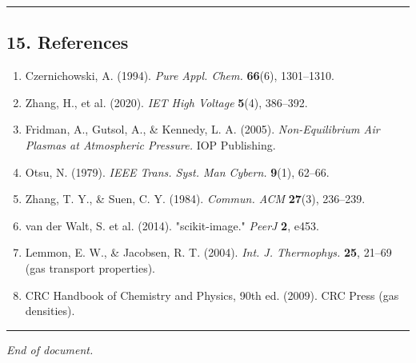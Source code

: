 \documentclass[
  11pt,
]{article}
\providecommand{\tightlist}{%
  \setlength{\itemsep}{0pt}\setlength{\parskip}{0pt}}
\begin{document}
\begin{center}\rule{0.5\linewidth}{0.5pt}\end{center}

\hypertarget{15-references}{%
\subsection{15. References}\label{15-references}}

\begin{enumerate}
\def\labelenumi{\arabic{enumi}.}
\tightlist
\item
  Czernichowski, A. (1994). \emph{Pure Appl. Chem.} \textbf{66}(6),
  1301--1310.
\item
  Zhang, H., et al. (2020). \emph{IET High Voltage} \textbf{5}(4),
  386--392.
\item
  Fridman, A., Gutsol, A., \& Kennedy, L. A. (2005).
  \emph{Non-Equilibrium Air Plasmas at Atmospheric Pressure.} IOP
  Publishing.
\item
  Otsu, N. (1979). \emph{IEEE Trans. Syst. Man Cybern.} \textbf{9}(1),
  62--66.
\item
  Zhang, T. Y., \& Suen, C. Y. (1984). \emph{Commun. ACM}
  \textbf{27}(3), 236--239.
\item
  van der Walt, S. et al. (2014). "scikit-image." \emph{PeerJ}
  \textbf{2}, e453.
\item
  Lemmon, E. W., \& Jacobsen, R. T. (2004). \emph{Int. J. Thermophys.}
  \textbf{25}, 21--69 (gas transport properties).
\item
  CRC Handbook of Chemistry and Physics, 90th ed. (2009). CRC Press (gas
  densities).
\end{enumerate}

\begin{center}\rule{0.5\linewidth}{0.5pt}\end{center}

\emph{End of document.}
\end{document}

